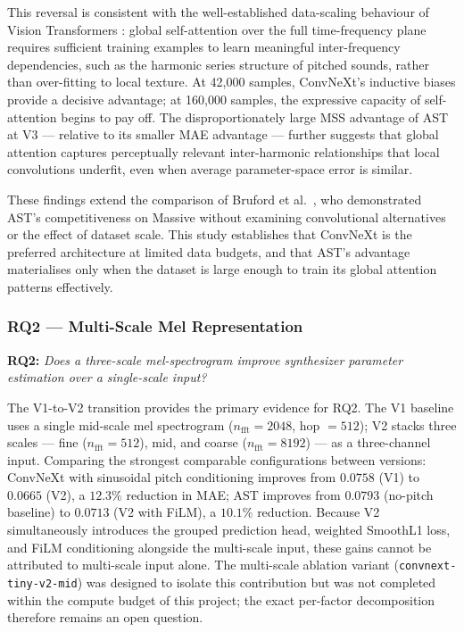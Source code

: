 \noindent \newline
This reversal is consistent with the well-established data-scaling behaviour of Vision Transformers \cite{dosovitskiy2021vit}: global self-attention over the full time-frequency plane requires sufficient training examples to learn meaningful inter-frequency dependencies, such as the harmonic series structure of pitched sounds, rather than over-fitting to local texture. At 42{,}000 samples, ConvNeXt's inductive biases provide a decisive advantage; at 160{,}000 samples, the expressive capacity of self-attention begins to pay off. The disproportionately large MSS advantage of AST at V3 — relative to its smaller MAE advantage — further suggests that global attention captures perceptually relevant inter-harmonic relationships that local convolutions underfit, even when average parameter-space error is similar.

\noindent \newline
These findings extend the comparison of Bruford et al.\ \cite{bruford2024ast}, who demonstrated AST's competitiveness on Massive without examining convolutional alternatives or the effect of dataset scale. This study establishes that ConvNeXt is the preferred architecture at limited data budgets, and that AST's advantage materialises only when the dataset is large enough to train its global attention patterns effectively.

\subsubsection{RQ2 — Multi-Scale Mel Representation}

\noindent
\textbf{RQ2:} \textit{Does a three-scale mel-spectrogram improve synthesizer parameter estimation over a single-scale input?}

\noindent \newline
The V1-to-V2 transition provides the primary evidence for RQ2. The V1 baseline uses a single mid-scale mel spectrogram ($n_{\text{fft}}=2048$, hop $=512$); V2 stacks three scales — fine ($n_{\text{fft}}=512$), mid, and coarse ($n_{\text{fft}}=8192$) — as a three-channel input. Comparing the strongest comparable configurations between versions: ConvNeXt with sinusoidal pitch conditioning improves from $0.0758$ (V1) to $0.0665$ (V2), a $12.3\%$ reduction in MAE; AST improves from $0.0793$ (no-pitch baseline) to $0.0713$ (V2 with FiLM), a $10.1\%$ reduction. Because V2 simultaneously introduces the grouped prediction head, weighted SmoothL1 loss, and FiLM conditioning alongside the multi-scale input, these gains cannot be attributed to multi-scale input alone. The multi-scale ablation variant (\texttt{convnext-tiny-v2-mid}) was designed to isolate this contribution but was not completed within the compute budget of this project; the exact per-factor decomposition therefore remains an open question.

